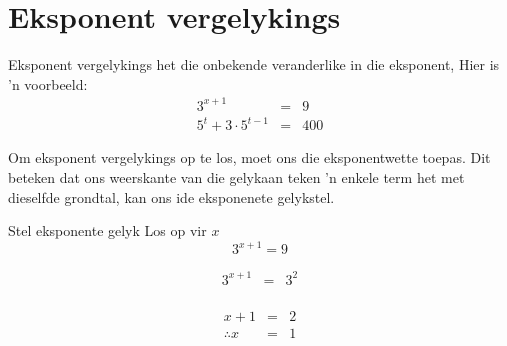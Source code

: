 \section{Eksponent vergelykings}

Eksponent vergelykings het die onbekende veranderlike in die eksponent, Hier is 'n voorbeeld:
\begin{eqnarray*}
 3^{x+1} & = & 9 \\
5^t + 3 \cdot 5^{t-1} & = & 400
\end{eqnarray*}

Om eksponent vergelykings op te los, moet ons die eksponentwette toepas. Dit beteken dat ons weerskante van die gelykaan teken 'n enkele term het met dieselfde grondtal, kan ons ide eksponenete gelykstel.




\begin{wex}
{%
Stel eksponente gelyk
}
{%
Los op vir $x$
$$ 3^{x+1} = 9 $$
}
{%

\begin{eqnarray*}
 3^{x+1} & = & 3^2 \\
\end{eqnarray*}

\begin{eqnarray*}
 {x+1} & = & 2 \\
\therefore x & = & 1
\end{eqnarray*}
}
\end{wex}





